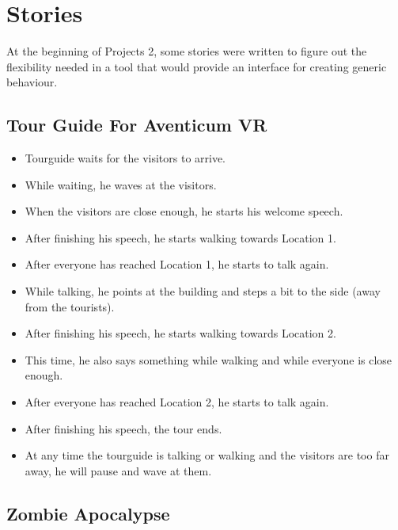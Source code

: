 \chapter{Stories}
\label{chap:appendix_stories}

At the beginning of Projects 2, some stories were written to figure out the flexibility needed in a tool that would provide an interface for creating generic behaviour.

\section{Tour Guide For Aventicum VR}

\begin{itemize}
    \item Tourguide waits for the visitors to arrive.
    \item While waiting, he waves at the visitors.
    \item When the visitors are close enough, he starts his welcome speech.
    \item After finishing his speech, he starts walking towards Location 1.
    \item After everyone has reached Location 1, he starts to talk again.
    \item While talking, he points at the building and steps a bit to the side (away from the tourists).
    \item After finishing his speech, he starts walking towards Location 2.
    \item This time, he also says something while walking and while everyone is close enough.
    \item After everyone has reached Location 2, he starts to talk again.
    \item After finishing his speech, the tour ends.
    \item At any time the tourguide is talking or walking and the visitors are too far away, he will pause and wave at them.
\end{itemize}

\section{Zombie Apocalypse}


